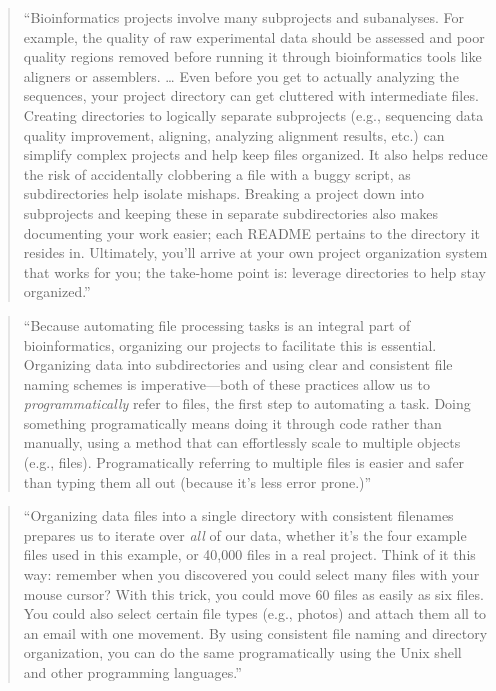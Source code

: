 \documentclass[]{tufte-book}
\begin{document}
\begin{quote}
``Bioinformatics projects involve many subprojects and subanalyses. For example, the
quality of raw experimental data should be assessed and poor quality regions removed
before running it through bioinformatics tools like aligners or assemblers. \ldots{} Even
before you get to actually analyzing the sequences, your project directory can get
cluttered with intermediate files. Creating directories to logically separate subprojects
(e.g., sequencing data quality improvement, aligning, analyzing alignment results, etc.)
can simplify complex projects and help keep files organized. It also helps reduce the
risk of accidentally clobbering a file with a buggy script, as subdirectories help
isolate mishaps. Breaking a project down into subprojects and keeping these in separate
subdirectories also makes documenting your work easier; each README pertains to the
directory it resides in. Ultimately, you'll arrive at your own project organization
system that works for you; the take-home point is: leverage directories to help stay
organized.'' \citep{buffalo2015bioinformatics}
\end{quote}

\begin{quote}
``Because automating file processing tasks is an integral part of bioinformatics,
organizing our projects to facilitate this is essential. Organizing data into subdirectories
and using clear and consistent file naming schemes is imperative---both of these practices
allow us to \emph{programmatically} refer to files, the first step to automating a task.
Doing something programatically means doing it through code rather than manually, using
a method that can effortlessly scale to multiple objects (e.g., files). Programatically
referring to multiple files is easier and safer than typing them all out (because it's
less error prone.)'' \citep{buffalo2015bioinformatics}
\end{quote}

\begin{quote}
``Organizing data files into a single directory with consistent filenames prepares us to
iterate over \emph{all} of our data, whether it's the four example files used in this example,
or 40,000 files in a real project. Think of it this way: remember when you discovered you
could select many files with your mouse cursor? With this trick, you could move 60 files
as easily as six files. You could also select certain file types (e.g., photos) and attach
them all to an email with one movement. By using consistent file naming and directory
organization, you can do the same programatically using the Unix shell and other
programming languages.'' \citep{buffalo2015bioinformatics}
\end{quote}
\end{document}
